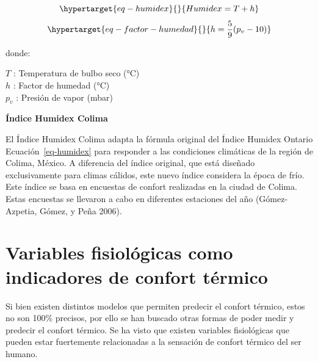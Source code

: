 \documentclass[
  12pt,
  letterpaper,
  DIV=11,
  numbers=noendperiod]{scrreport}
\begin{document}
\begin{equation}\protect\hypertarget{eq-humidex}{}{
Humidex = T + h 
}\label{eq-humidex}\end{equation}
\begin{equation}\protect\hypertarget{eq-factor-humedad}{}{ 
h = \frac{5}{9}(p_v- 10) 
}\label{eq-factor-humedad}\end{equation}

donde:

\(T\) : Temperatura de bulbo seco (°C)\\
\(h\) : Factor de humedad (°C)\\
\(p_v\) : Presión de vapor (mbar)

\textbf{Índice Humidex Colima}

El Índice Humidex Colima adapta la fórmula original del Índice Humidex
Ontario Ecuación~\ref{eq-humidex} para responder a las condiciones
climáticas de la región de Colima, México. A diferencia del índice
original, que está diseñado exclusivamente para climas cálidos, este
nuevo índice considera la época de frío. Este índice se basa en
encuestas de confort realizadas en la ciudad de Colima. Estas encuestas
se llevaron a cabo en diferentes estaciones del año (Gómez-Azpetia,
Gómez, y Peña 2006).

\hypertarget{variables-fisioluxf3gicas-como-indicadores-de-confort-tuxe9rmico}{%
\section{Variables fisiológicas como indicadores de confort
térmico}\label{variables-fisioluxf3gicas-como-indicadores-de-confort-tuxe9rmico}}

Si bien existen distintos modelos que permiten predecir el confort
térmico, estos no son 100\% precisos, por ello se han buscado otras
formas de poder medir y predecir el confort térmico. Se ha visto que
existen variables fisiológicas que pueden estar fuertemente relacionadas
a la sensación de confort térmico del ser humano.
\end{document}
